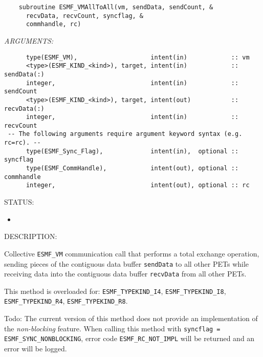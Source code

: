   
\begin{verbatim}    subroutine ESMF_VMAllToAll(vm, sendData, sendCount, &
      recvData, recvCount, syncflag, &
      commhandle, rc)\end{verbatim}{\em ARGUMENTS:}
\begin{verbatim}      type(ESMF_VM),                    intent(in)            :: vm
      <type>(ESMF_KIND_<kind>), target, intent(in)            :: sendData(:)
      integer,                          intent(in)            :: sendCount
      <type>(ESMF_KIND_<kind>), target, intent(out)           :: recvData(:)
      integer,                          intent(in)            :: recvCount
 -- The following arguments require argument keyword syntax (e.g. rc=rc). --
      type(ESMF_Sync_Flag),             intent(in),  optional :: syncflag
      type(ESMF_CommHandle),            intent(out), optional :: commhandle
      integer,                          intent(out), optional :: rc\end{verbatim}
{\sf STATUS:}
   \begin{itemize}
   \item{}
   \end{itemize}
  
{\sf DESCRIPTION:\\ }


     Collective {\tt ESMF\_VM} communication call that performs a total exchange
     operation, sending pieces of the contiguous data buffer {\tt sendData} to
     all other PETs while receiving data into the contiguous data buffer
     {\tt recvData} from all other PETs.
  
     This method is overloaded for:
     {\tt ESMF\_TYPEKIND\_I4}, {\tt ESMF\_TYPEKIND\_I8},
     {\tt ESMF\_TYPEKIND\_R4}, {\tt ESMF\_TYPEKIND\_R8}.
  
     {\sc Todo:} The current version of this method does not provide an 
     implementation of the {\em non-blocking} feature. When calling this 
     method with {\tt syncflag = ESMF\_SYNC\_NONBLOCKING}, error code 
     {\tt ESMF\_RC\_NOT\_IMPL} will be returned and an error will be 
     logged.
  
